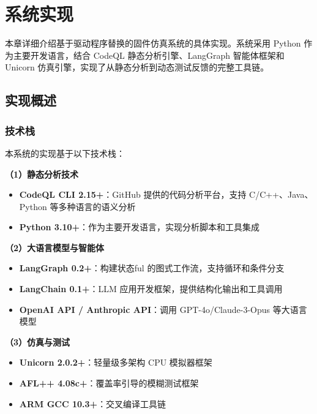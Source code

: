 \chapter{系统实现}
\label{chap:implementation}

本章详细介绍基于驱动程序替换的固件仿真系统的具体实现。系统采用 Python 作为主要开发语言，结合 CodeQL 静态分析引擎、LangGraph 智能体框架和 Unicorn 仿真引擎，实现了从静态分析到动态测试反馈的完整工具链。

\section{实现概述}
\label{sec:implementation_overview}

\subsection{技术栈}

本系统的实现基于以下技术栈：

\textbf{（1）静态分析技术}

\begin{itemize}
    \item \textbf{CodeQL CLI 2.15+}：GitHub 提供的代码分析平台，支持 C/C++、Java、Python 等多种语言的语义分析
    \item \textbf{Python 3.10+}：作为主要开发语言，实现分析脚本和工具集成
\end{itemize}

\textbf{（2）大语言模型与智能体}

\begin{itemize}
    \item \textbf{LangGraph 0.2+}：构建状态ful 的图式工作流，支持循环和条件分支
    \item \textbf{LangChain 0.1+}：LLM 应用开发框架，提供结构化输出和工具调用
    \item \textbf{OpenAI API / Anthropic API}：调用 GPT-4o/Claude-3-Opus 等大语言模型
\end{itemize}

\textbf{（3）仿真与测试}

\begin{itemize}
    \item \textbf{Unicorn 2.0.2+}：轻量级多架构 CPU 模拟器框架
    \item \textbf{AFL++ 4.08c+}：覆盖率引导的模糊测试框架
    \item \textbf{ARM GCC 10.3+}：交叉编译工具链
\end{itemize}

